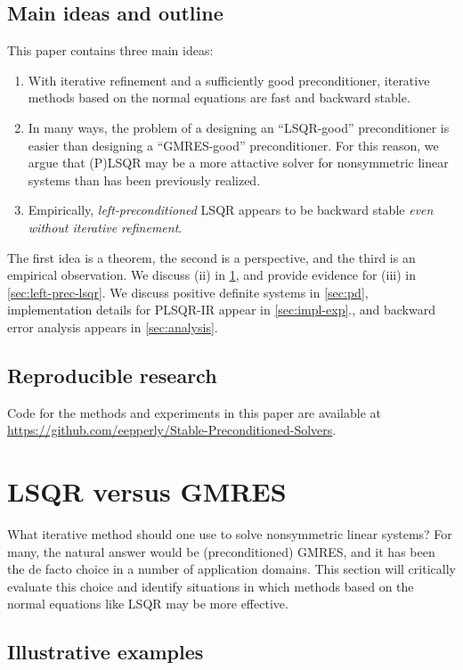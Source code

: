 \documentclass[onefignum,onetabnum,pagebackref,dvipsnames]{siamart220329}
\begin{document}
\subsection{Main ideas and outline}
This paper contains three main ideas:
%
\begin{enumerate}[label=(\roman*)]
    \item With iterative refinement and a sufficiently good preconditioner, iterative methods based on the normal equations are fast and backward stable.
    \item In many ways, the problem of a designing an ``LSQR-good'' preconditioner is easier than designing a ``GMRES-good'' preconditioner.
    For this reason, we argue that (P)LSQR may be a more attactive solver for nonsymmetric linear systems than has been previously realized.
    \item Empirically, \emph{left-preconditioned} LSQR appears to be backward stable \emph{even without iterative refinement}.
\end{enumerate}
%
The first idea is a theorem, the second is a perspective, and the third is an empirical observation.
We discuss (ii) in \cref{sec:lsqr}, and provide evidence for (iii) in \cref{sec:left-prec-lsqr}.
We discuss positive definite systems in \cref{sec:pd}, implementation details for PLSQR-IR appear in \cref{sec:impl-exp}., and backward error analysis appears in \cref{sec:analysis}.

\subsection{Reproducible research}
Code for the methods and experiments in this paper are available at \url{https://github.com/eepperly/Stable-Preconditioned-Solvers}.

\section{LSQR versus GMRES} \label{sec:lsqr}

What iterative method should one use to solve nonsymmetric linear systems?
For many, the natural answer would be (preconditioned) GMRES, and it has been the de facto choice in a number of application domains.
This section will critically evaluate this choice and identify situations in which methods based on the normal equations like LSQR may be more effective.

\subsection{Illustrative examples}
\end{document}
